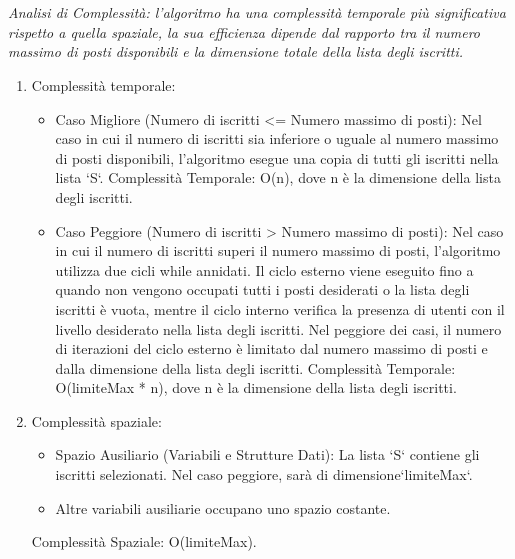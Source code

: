 \\
\\
\textit{Analisi di Complessità: l'algoritmo ha una complessità temporale più significativa rispetto a quella spaziale, la sua efficienza dipende dal rapporto tra il numero massimo di posti disponibili e la dimensione totale della lista degli iscritti.}
\begin{enumerate}
	\item Complessità temporale: 
        \begin{itemize}
            \item Caso Migliore (Numero di iscritti <= Numero massimo di posti):
                Nel caso in cui il numero di iscritti sia inferiore o uguale al numero massimo di posti disponibili, l'algoritmo esegue una copia di tutti gli iscritti nella lista `S`.
                Complessità Temporale: O(n), dove n è la dimensione della lista degli iscritti.
            \item Caso Peggiore (Numero di iscritti > Numero massimo di posti):
                Nel caso in cui il numero di iscritti superi il numero massimo di posti, l'algoritmo utilizza due cicli while annidati. Il ciclo esterno viene eseguito fino a quando non vengono occupati tutti i posti desiderati o la lista degli iscritti è vuota, mentre il ciclo interno verifica la presenza di utenti con il livello desiderato nella lista degli iscritti.
                Nel peggiore dei casi, il numero di iterazioni del ciclo esterno è limitato dal numero massimo di posti e dalla dimensione della lista degli iscritti.
                Complessità Temporale: O(limiteMax * n), dove n è la dimensione della lista degli
                iscritti.
        \end{itemize}
	\item Complessità spaziale: 
        \begin{itemize}
            \item Spazio Ausiliario (Variabili e Strutture Dati): La lista `S` contiene gli             iscritti selezionati. Nel caso peggiore, sarà di dimensione`limiteMax`.
            \item Altre variabili ausiliarie occupano uno spazio costante.
        \end{itemize}    
            Complessità Spaziale: O(limiteMax).
\end{enumerate}


